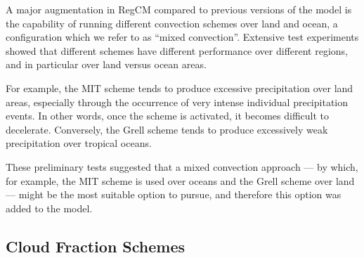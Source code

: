{\begin{enumerate}
\end{enumerate}

A major augmentation in \ac{RegCM} compared to previous versions of the model
is the capability of running different convection schemes over land and ocean,
a configuration which we refer to as ``mixed convection''. Extensive test
experiments showed that different schemes have different performance over
different regions, and in particular over land versus ocean areas.

For example, the MIT scheme tends to produce excessive precipitation over land
areas, especially through the occurrence of very intense individual
precipitation events. In other words, once the scheme is activated, it becomes
difficult to decelerate. Conversely, the Grell scheme tends to produce
excessively weak precipitation over tropical oceans.

These preliminary tests suggested that a mixed convection approach — by which,
for example, the MIT scheme is used over oceans and the Grell scheme over land
— might be the most suitable option to pursue, and therefore this option was
added to the model.

\subsection{Cloud Fraction Schemes} \label{sec:cloudfraction}

}
